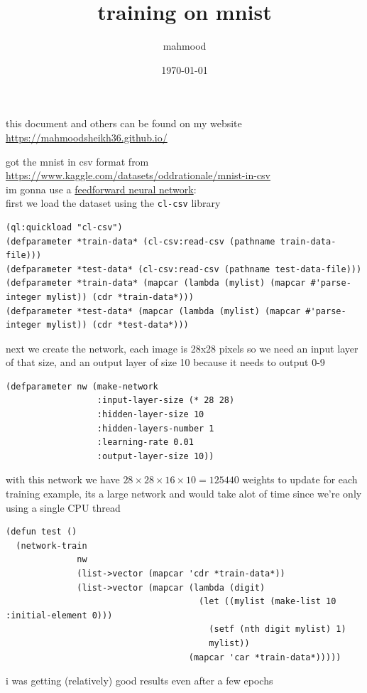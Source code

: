 \documentclass[a4paper,12pt]{article}
\author{mahmood}
\date{\today}
\title{training on mnist}
\begin{document}
\maketitle
\begin{note}
this document and others can be found on my website\\
\url{https://mahmoodsheikh36.github.io/}
\end{note}
got the mnist in csv format from \url{https://www.kaggle.com/datasets/oddrationale/mnist-in-csv}\\
im gonna use a \href{20230502235623-feedforward_neural_network.org}{feedforward neural network}:\\
first we load the dataset using the \texttt{cl-csv} library\\
\lstset{language=Lisp,label= ,caption= ,captionpos=b,numbers=none}
\begin{lstlisting}
(ql:quickload "cl-csv")
(defparameter *train-data* (cl-csv:read-csv (pathname train-data-file)))
(defparameter *test-data* (cl-csv:read-csv (pathname test-data-file)))
(defparameter *train-data* (mapcar (lambda (mylist) (mapcar #'parse-integer mylist)) (cdr *train-data*)))
(defparameter *test-data* (mapcar (lambda (mylist) (mapcar #'parse-integer mylist)) (cdr *test-data*)))
\end{lstlisting}

next we create the network, each image is 28x28 pixels so we need an input layer of that size, and an output layer of size 10 because it needs to output 0-9\\
\lstset{language=Lisp,label= ,caption= ,captionpos=b,numbers=none}
\begin{lstlisting}
(defparameter nw (make-network
                  :input-layer-size (* 28 28)
                  :hidden-layer-size 10
                  :hidden-layers-number 1
                  :learning-rate 0.01
                  :output-layer-size 10))
\end{lstlisting}

with this network we have \(28 \times 28 \times 16 \times 10 = 125440\) weights to update for each training example, its a large network and would take alot of time since we're only using a single CPU thread\\
\lstset{language=Lisp,label= ,caption= ,captionpos=b,numbers=none}
\begin{lstlisting}
(defun test ()
  (network-train
              nw
              (list->vector (mapcar 'cdr *train-data*))
              (list->vector (mapcar (lambda (digit)
                                      (let ((mylist (make-list 10 :initial-element 0)))
                                        (setf (nth digit mylist) 1)
                                        mylist))
                                    (mapcar 'car *train-data*)))))
\end{lstlisting}

i was getting (relatively) good results even after a few epochs
\end{document}
